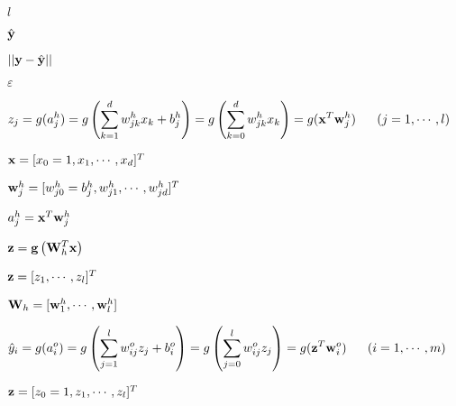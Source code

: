 \documentclass{article}
\def\lthtmlcheckvsize{\ifdim\ht\sizebox<\vsize 
  \ifdim\wd\sizebox<\hsize\expandafter\hfill\fi \expandafter\vfill
  \else\expandafter\vss\fi}%
\begin{document}
{\newpage\clearpage
{}%
$ l$%
\lthtmlindisplaymathZ
\lthtmlcheckvsize\clearpage}

{\newpage\clearpage
{}%
$ \hat{\bf y}$%
\lthtmlindisplaymathZ
\lthtmlcheckvsize\clearpage}

{\newpage\clearpage
{}%
$ ||{\bf y}-\hat{\bf y}||$%
\lthtmlindisplaymathZ
\lthtmlcheckvsize\clearpage}

{\newpage\clearpage
{}%
$ \varepsilon$%
\lthtmlindisplaymathZ
\lthtmlcheckvsize\clearpage}

{\newpage\clearpage
{}%
$\displaystyle z_j=g(a^h_j)=g\left(\sum_{k=1}^d w_{jk}^h x_k+b_j^h\right)
=g\left(\sum_{k=0}^d w_{jk}^h x_k\right)=g({\bf x}^T{\bf w}^h_j)
\;\;\;\;\;\;(j=1,\cdots,l)$%
\lthtmlindisplaymathZ
\lthtmlcheckvsize\clearpage}

{\newpage\clearpage
{}%
$ {\bf x}=[x_0=1,x_1,\cdots,x_d]^T$%
\lthtmlindisplaymathZ
\lthtmlcheckvsize\clearpage}

{\newpage\clearpage
{}%
$ {\bf w}_j^h=[w_{j0}^h=b_j^h,w_{j1}^h,\cdots,w_{jd}^h]^T$%
\lthtmlindisplaymathZ
\lthtmlcheckvsize\clearpage}

{\newpage\clearpage
{}%
$ a^h_j={\bf x}^T{\bf w}^h_j$%
\lthtmlindisplaymathZ
\lthtmlcheckvsize\clearpage}

{\newpage\clearpage
{}%
$\displaystyle {\bf z}={\bf g}\left({\bf W}_h^T{\bf x}\right)$%
\lthtmlindisplaymathZ
\lthtmlcheckvsize\clearpage}

{\newpage\clearpage
{}%
$ {\bf z}=[z_1,\cdots,z_l]^T$%
\lthtmlindisplaymathZ
\lthtmlcheckvsize\clearpage}

{\newpage\clearpage
{}%
$ {\bf W}_h=[{\bf w}^h_1,\cdots,{\bf w}^h_l]$%
\lthtmlindisplaymathZ
\lthtmlcheckvsize\clearpage}

{\newpage\clearpage
{}%
$\displaystyle \hat{y}_i=g(a_i^o)=g\left(\sum_{j=1}^l w_{ij}^o z_j+b_i^o\right)
=g\left(\sum_{j=0}^l w_{ij}^o z_j\right)=g({\bf z}^T{\bf w}^o_i)
\;\;\;\;\;\;(i=1,\cdots,m)$%
\lthtmlindisplaymathZ
\lthtmlcheckvsize\clearpage}

{\newpage\clearpage
{}%
$ {\bf z}=[z_0=1,z_1,\cdots,z_l]^T$%
\lthtmlindisplaymathZ
\lthtmlcheckvsize\clearpage}
\end{document}
